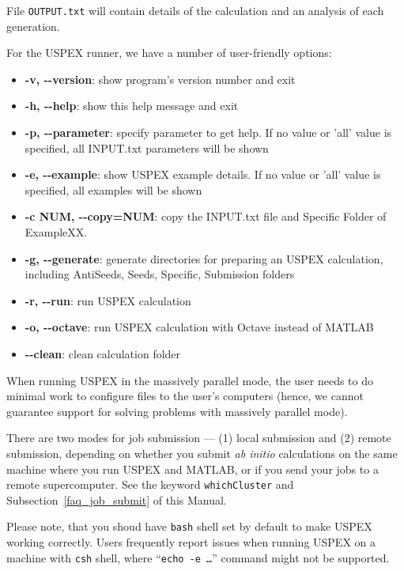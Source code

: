 \documentclass[12pt]{article}
\newcommand{\keyword}[1]{\texttt{#1}}
\newcommand{\file}[1]{\texttt{#1}}
\begin{document}
File \file{OUTPUT.txt} will contain details of the calculation and an analysis
of each generation.

\vspace{\baselineskip}
For the USPEX runner, we have a number of user-friendly options:
\begin{itemize}
   \item[] \textbf{-v, -{}-version}:  show program's version number and exit
   \item[] \textbf{-h, -{}-help}:   show this help message and exit
   \item[] \textbf{-p, -{}-parameter}: specify parameter to get help. If no value or 'all' value is specified, all INPUT.txt parameters will be shown
   \item[] \textbf{-e, -{}-example}: show USPEX example details. If no value or 'all' value is specified, all examples will be shown
   \item[] \textbf{-c NUM, -{}-copy=NUM}: copy the INPUT.txt file and Specific Folder of ExampleXX.
   \item[] \textbf{-g, -{}-generate}:  generate directories for preparing an USPEX calculation, including AntiSeeds, Seeds, Specific, Submission folders
   \item[] \textbf{-r, -{}-run}:    run USPEX calculation
   \item[] \textbf{-o, -{}-octave}:    run USPEX calculation with Octave instead of MATLAB
   \item[] \textbf{-{}-clean}:    clean calculation folder
\end{itemize}

When running USPEX in the massively parallel mode, the user needs to do minimal
work to configure files to the user's computers (hence, we cannot guarantee
support for solving problems with massively parallel mode).

There are two modes for job submission --- (1) local submission and (2) remote
submission, depending on whether you submit \emph{ab initio} calculations on the
same machine where you run USPEX and MATLAB, or if you send your jobs to a
remote supercomputer. See the keyword \keyword{whichCluster} and
Subsection~\ref{faq_job_submit} of this Manual.

Please note, that you shoud have \file{bash} shell set by default to make USPEX
working correctly. Users frequently report issues when running USPEX on a
machine with \file{csh} shell, where ``\texttt{echo -e \ldots}'' command might
not be supported.
\end{document}
